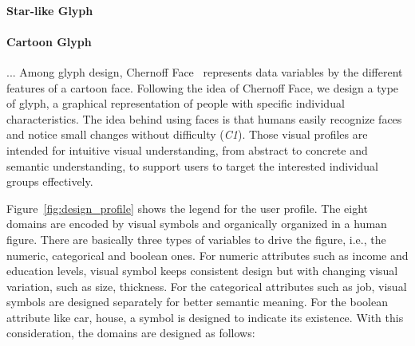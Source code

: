 \paragraph{Star-like Glyph} 

\paragraph{Cartoon Glyph} ... Among glyph design, Chernoff Face~\cite{chernoff1973use} represents data variables by the different features of a cartoon face. Following the idea of Chernoff Face, we design a type of glyph, a graphical representation of people with specific individual characteristics. The idea behind using faces is that humans easily recognize faces and notice small changes without difficulty (\textit{C1}). Those visual profiles are intended for intuitive visual understanding, from abstract to concrete and semantic understanding, to support users to target the interested individual groups effectively.

Figure~\ref{fig:design_profile} shows the legend for the user profile. The eight domains are encoded by visual symbols and organically organized in a human figure. There are basically three types of variables to drive the figure, i.e., the numeric, categorical and boolean ones. For numeric attributes such as income and education levels, visual symbol keeps consistent design but with changing visual variation, such as size, thickness. For the categorical attributes such as job, visual symbols are designed separately for better semantic meaning. For the boolean attribute like car, house, a symbol is designed to indicate its existence. With this consideration, the domains are designed as follows:



